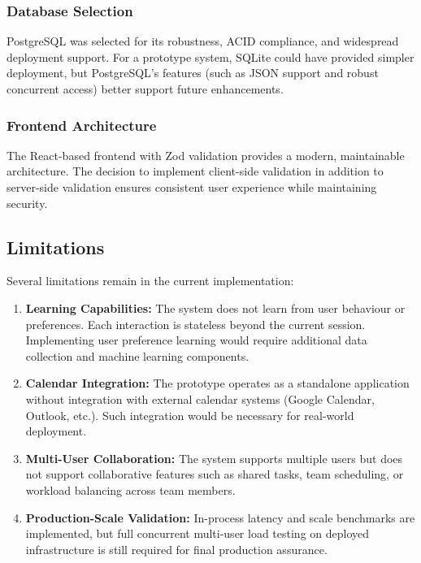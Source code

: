\documentclass[12pt]{article}
\begin{document}
\subsubsection{Database Selection}
PostgreSQL was selected for its robustness, ACID compliance, and widespread deployment support. For a prototype system, SQLite could have provided simpler deployment, but PostgreSQL's features (such as JSON support and robust concurrent access) better support future enhancements.

\subsubsection{Frontend Architecture}
The React-based frontend with Zod validation provides a modern, maintainable architecture. The decision to implement client-side validation in addition to server-side validation ensures consistent user experience while maintaining security.

\subsection{Limitations}

Several limitations remain in the current implementation:

\begin{enumerate}
    \item \textbf{Learning Capabilities:} The system does not learn from user behaviour or preferences. Each interaction is stateless beyond the current session. Implementing user preference learning would require additional data collection and machine learning components.
    
    \item \textbf{Calendar Integration:} The prototype operates as a standalone application without integration with external calendar systems (Google Calendar, Outlook, etc.). Such integration would be necessary for real-world deployment.
    
    \item \textbf{Multi-User Collaboration:} The system supports multiple users but does not support collaborative features such as shared tasks, team scheduling, or workload balancing across team members.
    
    \item \textbf{Production-Scale Validation:} In-process latency and scale benchmarks are implemented, but full concurrent multi-user load testing on deployed infrastructure is still required for final production assurance.
\end{enumerate}
\end{document}
